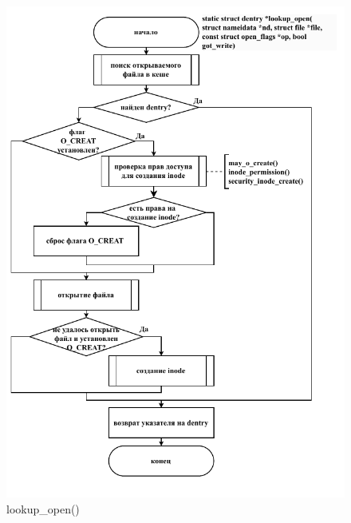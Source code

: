 \begin{figure}[ht]
	\centering
	\includegraphics[width=\textwidth]{img/lookup_open.pdf}
	\caption{lookup\_open()}
\end{figure}

